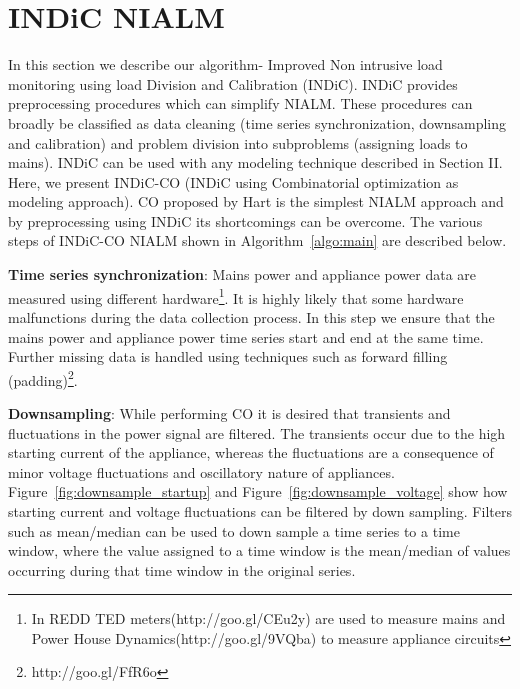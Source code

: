 \documentclass[conference]{IEEEtran}
\newcommand{\figref}[1]{Figure~\ref{#1}}
\newcommand{\algoref}[1]{Algorithm~\ref{#1}}
\newcommand{\indic}{INDiC}
\begin{document}

\section{INDiC NIALM}
\noindent In this section we describe our algorithm- Improved Non intrusive load monitoring using load Division and Calibration (\indic). INDiC provides preprocessing procedures which can simplify NIALM. These procedures can broadly be classified as data cleaning (time series synchronization, downsampling and calibration) and problem division into subproblems (assigning loads to mains). INDiC can be used with any modeling technique described in Section II. Here, we present INDiC-CO (INDiC using Combinatorial optimization as modeling approach). CO proposed by Hart \cite{hart} is the simplest NIALM approach and by preprocessing using INDiC its shortcomings can be overcome. The various steps of INDiC-CO NIALM shown in \algoref{algo:main} are described below. 

\noindent\textbf{Time series synchronization}: Mains power and appliance power data are measured using different hardware\footnote{In REDD\cite{redd} TED meters(http://goo.gl/CEu2y) are used to measure mains and Power House Dynamics(http://goo.gl/9VQba) to measure appliance circuits}. It is highly likely that some hardware malfunctions during the data collection process. In this step we ensure that the mains power and appliance power time series start and end at the same time. Further missing data is handled using techniques such as forward filling (padding)\footnote{http://goo.gl/FfR6o}.

\noindent\textbf{Downsampling}: While performing CO it is desired that transients and fluctuations in the power signal are filtered\cite{hart}. The transients occur due to the high starting current of the appliance, whereas the fluctuations are a consequence of minor voltage fluctuations and oscillatory nature of appliances. \figref{fig:downsample_startup} and \figref{fig:downsample_voltage} show how starting current and voltage fluctuations can be filtered by down sampling. Filters such as mean/median can be used to down sample a time series to a time window, where the value assigned to a time window is the mean/median of values occurring during that time window in the original series.
\end{document}
